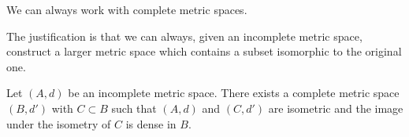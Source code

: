 
\sbasic

\sstart
{}


We can always work with
complete metric spaces.

The justification is that
we can always, given an incomplete
metric space, construct a larger
metric space which contains a
subset isomorphic to the original
one.


\begin{prop}
Let $(A, d)$ be an
incomplete metric space.
There exists a complete metric
space
$(B, d')$ with $C \subset B$
such that $(A, d)$ and
$(C, d')$ are isometric and the image
under the isometry of $C$ is
dense in $B$.
\end{prop}
\strats
